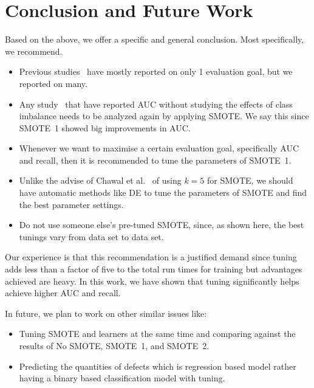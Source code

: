 \documentclass[sigconf,review, anonymous]{acmart}
\newcommand{\bi}{\begin{itemize}[leftmargin=0.4cm]}
\newcommand{\ei}{\end{itemize}}
\theoremstyle{break}
\theoremstyle{break}
\begin{document}
\section{Conclusion and Future Work}
\label{sect:conclusion}

Based on the above, we offer a specific and general conclusion. Most specifically, we recommend.
\bi
 \item Previous studies~\cite{ghotra2015revisiting,tantithamthavorn2016automated} have mostly reported on only 1 evaluation goal, but we reported on many.
 \item Any study~\cite{ghotra2015revisiting} that have reported AUC without studying the effects of class imbalance needs to be analyzed again by applying SMOTE. We say this since SMOTE~1 showed big improvements in AUC.
 \item Whenever we want to maximise a certain evaluation goal, specifically AUC and recall, then it is recommended to tune the parameters of SMOTE~1.
 \item Unlike the advise of Chawal et al.~\cite{chawla2002smote} of using $k=5$ for SMOTE, we should have automatic methods like DE to tune the parameters of SMOTE and find the best parameter settings.
 \item Do not use someone else's pre-tuned SMOTE, since, as shown here, the best tunings vary from data set to data set.
\ei

Our experience is that this recommendation is a justified demand since tuning adds less than a factor of five to the total run times for training but advantages achieved are heavy. In this work, we have shown that tuning significantly helps achieve higher AUC and recall.

In future, we plan to work on other similar issues like:
\bi
 \item Tuning SMOTE and learners at the same time and comparing against the results of No SMOTE, SMOTE~1, and SMOTE~2.
 \item Predicting the quantities of defects which is regression based model rather having a binary based classification model with tuning.
\ei

\balance


\medskip

\end{document}
